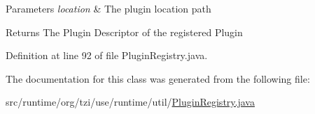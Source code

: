 \begin{DoxyParams}{Parameters}
{\em location} & The plugin location path \\
\hline
\end{DoxyParams}
\begin{DoxyReturn}{Returns}
The Plugin Descriptor of the registered Plugin 
\end{DoxyReturn}


Definition at line 92 of file Plugin\-Registry.\-java.



The documentation for this class was generated from the following file\-:\begin{DoxyCompactItemize}
\item 
src/runtime/org/tzi/use/runtime/util/\hyperlink{_plugin_registry_8java}{Plugin\-Registry.\-java}\end{DoxyCompactItemize}
